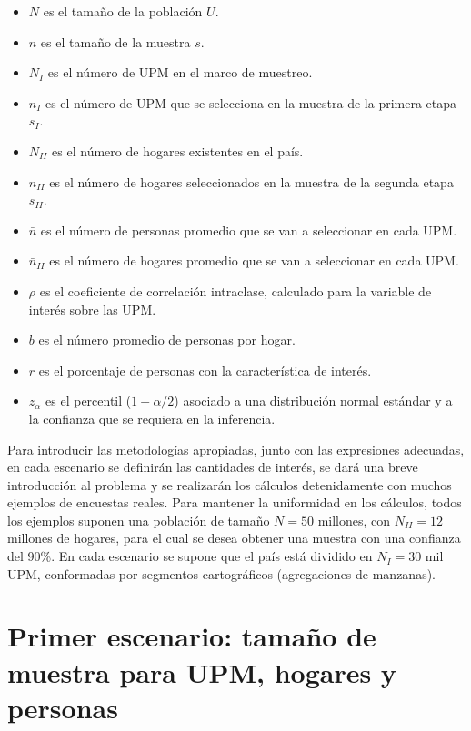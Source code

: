 \begin{itemize}
\tightlist
\item
  \(N\) es el tamaño de la población \(U\).
\item
  \(n\) es el tamaño de la muestra \(s\).
\item
  \(N_{I}\) es el número de UPM en el marco de muestreo.
\item
  \(n_{I}\) es el número de UPM que se selecciona en la muestra de la primera etapa \(s_I\).
\item
  \(N_{II}\) es el número de hogares existentes en el país.
\item
  \(n_{II}\) es el número de hogares seleccionados en la muestra de la segunda etapa \(s_{II}\).
\item
  \(\bar{n}\) es el número de personas promedio que se van a seleccionar en cada UPM.
\item
  \(\bar{n}_{II}\) es el número de hogares promedio que se van a seleccionar en cada UPM.
\item
  \(\rho\) es el coeficiente de correlación intraclase, calculado para la variable de interés sobre las UPM.
\item
  \(b\) es el número promedio de personas por hogar.
\item
  \(r\) es el porcentaje de personas con la característica de interés.
\item
  \(z_{\alpha}\) es el percentil (\(1- \alpha/2\)) asociado a una distribución normal estándar y a la confianza que se requiera en la inferencia.
\end{itemize}

Para introducir las metodologías apropiadas, junto con las expresiones adecuadas, en cada escenario se definirán las cantidades de interés, se dará una breve introducción al problema y se realizarán los cálculos detenidamente con muchos ejemplos de encuestas reales. Para mantener la uniformidad en los cálculos, todos los ejemplos suponen una población de tamaño \(N=50\) millones, con \(N_{II} = 12\) millones de hogares, para el cual se desea obtener una muestra con una confianza del 90\%. En cada escenario se supone que el país está dividido en \(N_{I} =30\) mil UPM, conformadas por segmentos cartográficos (agregaciones de manzanas).

\hypertarget{primer-escenario-tamano-de-muestra-para-upm-hogares-y-personas}{%
\section{Primer escenario: tamaño de muestra para UPM, hogares y personas}\label{primer-escenario-tamano-de-muestra-para-upm-hogares-y-personas}}

